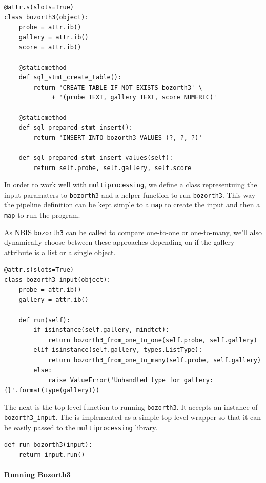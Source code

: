 \begin{verbatim}
@attr.s(slots=True)
class bozorth3(object):
    probe = attr.ib()
    gallery = attr.ib()
    score = attr.ib()

    @staticmethod
    def sql_stmt_create_table():
        return 'CREATE TABLE IF NOT EXISTS bozorth3' \
             + '(probe TEXT, gallery TEXT, score NUMERIC)'

    @staticmethod
    def sql_prepared_stmt_insert():
        return 'INSERT INTO bozorth3 VALUES (?, ?, ?)'

    def sql_prepared_stmt_insert_values(self):
        return self.probe, self.gallery, self.score
\end{verbatim}

In order to work well with \texttt{multiprocessing}, we define a class
representuing the input paramaters to \texttt{bozorth3} and a helper
function to run \texttt{bozorth3}. This way the pipeline definition can
be kept simple to a \texttt{map} to create the input and then a
\texttt{map} to run the program.

As NBIS \texttt{bozorth3} can be called to compare one-to-one or
one-to-many, we'll also dynamically choose between these approaches
depending on if the gallery attribute is a list or a single object.

\begin{verbatim}
@attr.s(slots=True)
class bozorth3_input(object):
    probe = attr.ib()
    gallery = attr.ib()

    def run(self):
        if isinstance(self.gallery, mindtct):
            return bozorth3_from_one_to_one(self.probe, self.gallery)
        elif isinstance(self.gallery, types.ListType):
            return bozorth3_from_one_to_many(self.probe, self.gallery)
        else:
            raise ValueError('Unhandled type for gallery: {}'.format(type(gallery)))
\end{verbatim}

The next is the top-level function to running \texttt{bozorth3}. It
accepts an instance of \texttt{bozorth3\_input}. The is implemented as a
simple top-level wrapper so that it can be easily passed to the
\texttt{multiprocessing} library.

\begin{verbatim}
def run_bozorth3(input):
    return input.run()
\end{verbatim}

\paragraph{Running Bozorth3}\label{running-bozorth3}

